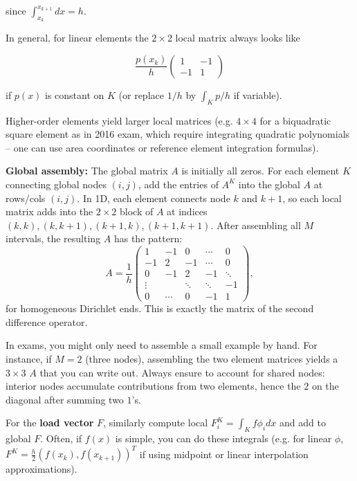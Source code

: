 \documentclass[a4paper,11pt]{article}
\begin{document}
since $\int_{x_k}^{x_{k+1}} dx = h$. 

In general, for linear elements the $2\times2$ local matrix always looks like

$$
\frac{p(x_k)}{h}\begin{pmatrix}1&-1\\-1&1\end{pmatrix}
$$

if $p(x)$ is constant on $K$ (or replace $1/h$ by $\int_K p/h$ if variable).

Higher-order elements yield larger local matrices (e.g. $4\times4$ for a biquadratic square element as in 2016 exam, which require integrating quadratic polynomials -- one can use area coordinates or reference element integration formulas).

\textbf{Global assembly:} The global matrix $A$ is initially all zeros. For each element $K$ connecting global nodes $(i,j)$, add the entries of $A^K$ into the global $A$ at rows/cols $(i,j)$. 
In 1D, each element connects node $k$ and $k+1$, so each local matrix adds into the $2\times2$ block of $A$ at indices $(k,k), (k,k+1), (k+1,k), (k+1,k+1)$. After assembling all $M$ intervals, the resulting $A$ has the pattern:
$$ A = \frac{1}{h}\begin{pmatrix}
        1      & -1     & 0      & \cdots & 0      \\
        -1     & 2      & -1     & \cdots & 0      \\
        0      & -1     & 2      & -1     & \ddots \\
        \vdots &        & \ddots & \ddots & -1     \\
        0      & \cdots & 0      & -1     & 1
    \end{pmatrix}, $$
for homogeneous Dirichlet ends. 
This is exactly the matrix of the second difference operator.

In exams, you might only need to assemble a small example by hand. 
For instance, if $M=2$ (three nodes), assembling the two element matrices yields a $3\times3$ $A$ that you can write out. 
Always ensure to account for shared nodes: interior nodes accumulate contributions from two elements, hence the $2$ on the diagonal after summing two $1$'s. 

For the \textbf{load vector} $F$, similarly compute local $F^K_i = \int_K f\phi_idx$ and add to global $F$. Often, if $f(x)$ is simple, you can do these integrals (e.g. for linear $\phi$, $F^K = \frac{h}{2}(f(x_k), f(x_{k+1}))^T$ if using midpoint or linear interpolation approximations).
\end{document}
